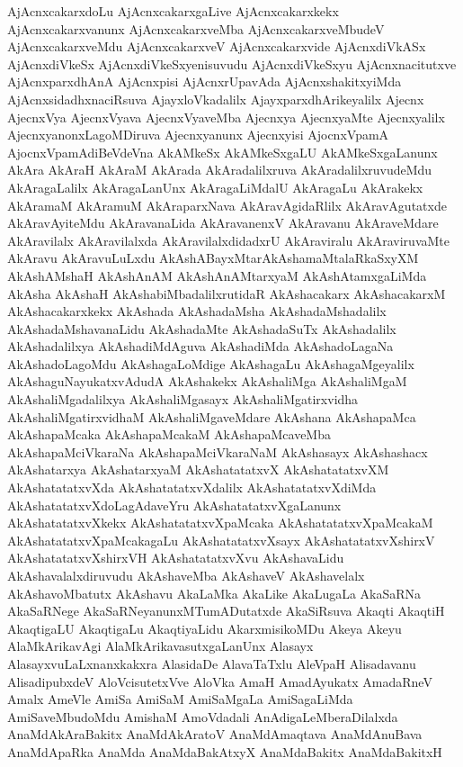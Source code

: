 {AjAcnxcakarxdoLu
AjAcnxcakarxgaLive
AjAcnxcakarxkekx
AjAcnxcakarxvanunx
AjAcnxcakarxveMba
AjAcnxcakarxveMbudeV
AjAcnxcakarxveMdu
AjAcnxcakarxveV
AjAcnxcakarxvide
AjAcnxdiVkASx
AjAcnxdiVkeSx
AjAcnxdiVkeSxyenisuvudu
AjAcnxdiVkeSxyu
AjAcnxnacitutxve
AjAcnxparxdhAnA
AjAcnxpisi
AjAcnxrUpavAda
AjAcnxshakitxyiMda
AjAcnxsidadhxnaciRsuva
AjayxloVkadalilx
AjayxparxdhArikeyalilx
Ajecnx
AjecnxVya
AjecnxVyava
AjecnxVyaveMba
Ajecnxya
AjecnxyaMte
Ajecnxyalilx
AjecnxyanonxLagoMDiruva
Ajecnxyanunx
Ajecnxyisi
AjocnxVpamA
AjocnxVpamAdiBeVdeVna
AkAMkeSx
AkAMkeSxgaLU
AkAMkeSxgaLanunx
AkAra
AkAraH
AkAraM
AkArada
AkAradalilxruva
AkAradalilxruvudeMdu
AkAragaLalilx
AkAragaLanUnx
AkAragaLiMdalU
AkAragaLu
AkArakekx
AkAramaM
AkAramuM
AkAraparxNava
AkAravAgidaRlilx
AkAravAgutatxde
AkAravAyiteMdu
AkAravanaLida
AkAravanenxV
AkAravanu
AkAraveMdare
AkAravilalx
AkAravilalxda
AkAravilalxdidadxrU
AkAraviralu
AkAraviruvaMte
AkAravu
AkAravuLuLxdu
AkAshABayxMtarAkAshamaMtalaRkaSxyXM
AkAshAMshaH
AkAshAnAM
AkAshAnAMtarxyaM
AkAshAtamxgaLiMda
AkAsha
AkAshaH
AkAshabiMbadalilxrutidaR
AkAshacakarx
AkAshacakarxM
AkAshacakarxkekx
AkAshada
AkAshadaMsha
AkAshadaMshadalilx
AkAshadaMshavanaLidu
AkAshadaMte
AkAshadaSuTx
AkAshadalilx
AkAshadalilxya
AkAshadiMdAguva
AkAshadiMda
AkAshadoLagaNa
AkAshadoLagoMdu
AkAshagaLoMdige
AkAshagaLu
AkAshagaMgeyalilx
AkAshaguNayukatxvAdudA
AkAshakekx
AkAshaliMga
AkAshaliMgaM
AkAshaliMgadalilxya
AkAshaliMgasayx
AkAshaliMgatirxvidha
AkAshaliMgatirxvidhaM
AkAshaliMgaveMdare
AkAshana
AkAshapaMca
AkAshapaMcaka
AkAshapaMcakaM
AkAshapaMcaveMba
AkAshapaMciVkaraNa
AkAshapaMciVkaraNaM
AkAshasayx
AkAshashacx
AkAshatarxya
AkAshatarxyaM
AkAshatatatxvX
AkAshatatatxvXM
AkAshatatatxvXda
AkAshatatatxvXdalilx
AkAshatatatxvXdiMda
AkAshatatatxvXdoLagAdaveYru
AkAshatatatxvXgaLanunx
AkAshatatatxvXkekx
AkAshatatatxvXpaMcaka
AkAshatatatxvXpaMcakaM
AkAshatatatxvXpaMcakagaLu
AkAshatatatxvXsayx
AkAshatatatxvXshirxV
AkAshatatatxvXshirxVH
AkAshatatatxvXvu
AkAshavaLidu
AkAshavalalxdiruvudu
AkAshaveMba
AkAshaveV
AkAshavelalx
AkAshavoMbatutx
AkAshavu
AkaLaMka
AkaLike
AkaLugaLa
AkaSaRNa
AkaSaRNege
AkaSaRNeyanunxMTumADutatxde
AkaSiRsuva
Akaqti
AkaqtiH
AkaqtigaLU
AkaqtigaLu
AkaqtiyaLidu
AkarxmisikoMDu
Akeya
Akeyu
AlaMkArikavAgi
AlaMkArikavasutxgaLanUnx
Alasayx
AlasayxvuLaLxnanxkakxra
AlasidaDe
AlavaTaTxlu
AleVpaH
Alisadavanu
AlisadipubxdeV
AloVcisutetxVve
AloVka
AmaH
AmadAyukatx
AmadaRneV
Amalx
AmeVle
AmiSa
AmiSaM
AmiSaMgaLa
AmiSagaLiMda
AmiSaveMbudoMdu
AmishaM
AmoVdadali
AnAdigaLeMberaDilalxda
AnaMdAkAraBakitx
AnaMdAkAratoV
AnaMdAmaqtava
AnaMdAnuBava
AnaMdApaRka
AnaMda
AnaMdaBakAtxyX
AnaMdaBakitx
AnaMdaBakitxH
}
